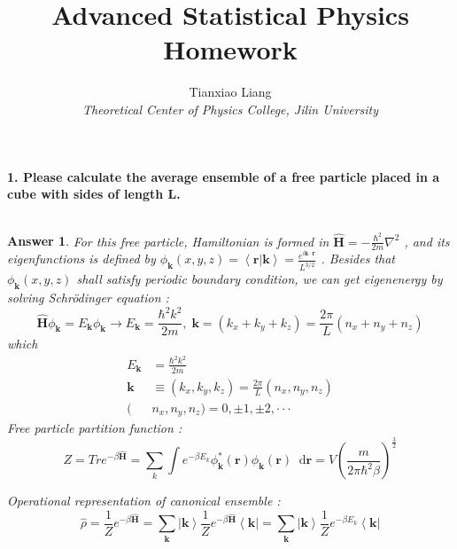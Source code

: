 \documentclass[12pt]{article}
\title{\textbf{Advanced Statistical Physics Homework}}
\author{Tianxiao Liang \quad 2018322003 \\ \emph{Theoretical Center of Physics College, Jilin University}}
\numberwithin{equation}{section}	 %
\begin{document}
\begin{spacing}{1.5}			%
\maketitle
\setlength{\parindent}{0pt}	%

\newcommand*{\dif}{\mathop{}\!\mathrm{d}} 		%
\newcommand*{\dps}{\displaystyle}				%
\newtheorem{proof*}{Answer}					%

\textbf{1. Please calculate the average ensemble of a free particle placed	 in a cube with sides of length $\bm L$.} \\		%
~\\
\begin{proof*}
For this free particle, Hamiltonian is formed in $\dps \bm{\hat H} = -\frac{\hbar^{2}}{2m}\nabla^{2}$ , and its eigenfunctions is defined by $\dps \phi_{\bm k}(x,y,z) = \left<\bm r|\bm k\right> = \frac{e^{i\bm{k\cdot r}}}{L^{3/2}}$ . Besides that $\phi_{\bm k}(x,y,z)$ shall satisfy periodic boundary condition, we can get eigenenergy by solving Schrödinger equation :
\begin{equation}
\bm{\hat H} \phi_{\bm k} = E_{\bm k} \phi_{\bm k} \longrightarrow E_{\bm k} = \frac{\hbar^{2}k^{2}}{2m} , \; \bm{k} = (k_{x} + k_{y} +k_{z}) = \frac{2\pi}{L}(n_{x}+n_{y}+n_{z})
\end{equation}
which
\begin{align*}
E_{\bm k} &= \frac{\hbar^{2}k^{2}}{2m} \\
\bm{k} &\equiv (k_{x}, k_{y}, k_{z}) = \frac{2\pi}{L}(n_{x}, n_{y}, n_{z}) \\
(&n_{x}, n_{y}, n_{z}) = 0, \pm1, \pm2, \cdot\cdot\cdot
\end{align*}
Free particle partition function :
\begin{equation}
Z = Tr e^{-\beta\bm{\hat H}} = \sum_{k} \int e^{-\beta E_{k}}\phi^{*}_{\bm k}(\bm{r})\phi_{\bm k}(\bm{r})\dif\bm{r} = V\left(\frac{m}{2\pi\hbar^{2}\beta}\right)^{\frac{3}{2}}
\end{equation}

Operational representation of canonical ensemble :
\begin{equation}
\hat\rho = \frac{1}{Z}e^{-\beta\bm{\hat H}} = \sum_{\bm k}\left|\bm k\right> \frac{1}{Z}e^{-\beta\bm{\hat H}} \left<\bm k\right| = \sum_{\bm k}\left|\bm k\right> \frac{1}{Z}e^{-\beta E_{k}} \left<\bm k\right|
\end{equation}


\end{proof*}
\end{spacing}
\end{document}
